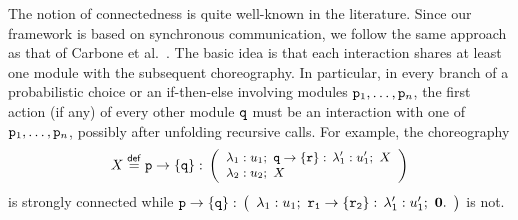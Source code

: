 % 
The notion of connectedness is quite well-known in the
literature. Since our framework is based on synchronous communication,
we follow the same approach as that of Carbone et
al.~\cite{CHY12}. The basic idea is that each interaction shares at
least one module with the subsequent choreography. In particular, in
every branch of a probabilistic choice or an if-then-else involving
modules $\mathtt{p}_1, \ldots, \mathtt{p}_n$, the first action (if any) of
every other module $\mathtt{q}$ must be an interaction with one of
$\mathtt{p}_1, \ldots, \mathtt{p}_n$, possibly after unfolding recursive
calls.
%
For example, the choreography
\begin{displaymath}\small
  X\stackrel{\mathsf{def}}{=} 
  \mathtt{p}\rightarrow \{\mathtt{q}\}:\,
  \left(
    \begin{array}{l}
      \lambda_1: u_1;\ \mathtt{q}\rightarrow \{\mathtt{r}\}:\, \lambda_1':u_1';\ X    \\
      \lambda_2: u_2;\ X
    \end{array}
  \right)
\end{displaymath}
%
is strongly connected while 
% 
$%
\interactBase{p}{q}:\,
\left(
  \begin{array}{l}
    \lambda_1: u_1;\ \interactBase{r_1}{r_2}:\, \lambda_1':u_1';\ \CEnd.
  \end{array}
\right) $ is not.
% 


\smallskip

